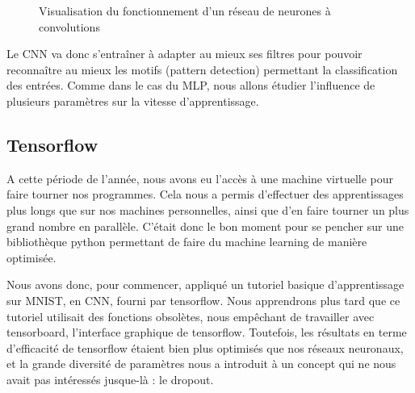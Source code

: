 \documentclass[
    10pt,
    a4paper,
    oneside,
    headinclude,footinclude,
    BCOR=5mm,
    captions=tableabove
]{scrartcl}
\begin{document}
\begin{figure}[h!]
\centering
{}
\hspace{1mm}
\caption{Visualisation du fonctionnement d'un réseau de neurones à convolutions}
\label{fig:CNN.png}
\end{figure}


Le CNN va donc s'entraîner à adapter au mieux ses filtres pour pouvoir reconnaître au mieux les motifs (pattern detection) permettant la classification des entrées. Comme dans le cas du MLP, nous allons étudier l'influence de plusieurs paramètres sur la vitesse d'apprentissage. 

\subsection{Tensorflow}

A cette période de l'année, nous avons eu l'accès à une machine virtuelle pour faire tourner nos programmes. Cela nous a permis d'effectuer des apprentissages plus longs que sur nos machines personnelles, ainsi que d'en faire tourner un plus grand nombre en parallèle. C'était donc le bon moment pour se pencher sur une bibliothèque python permettant de faire du machine learning de manière optimisée.

Nous avons donc, pour commencer, appliqué un tutoriel basique d'apprentissage sur MNIST, en CNN, fourni par tensorflow. Nous apprendrons plus tard que ce tutoriel utilisait des fonctions obsolètes, nous empêchant de travailler avec tensorboard, l'interface graphique de tensorflow. Toutefois, les résultats en terme d'efficacité de tensorflow étaient bien plus optimisés que nos réseaux neuronaux, et la grande diversité de paramètres nous a introduit à un concept qui ne nous avait pas intéressés jusque-là : le dropout.
\end{document}

